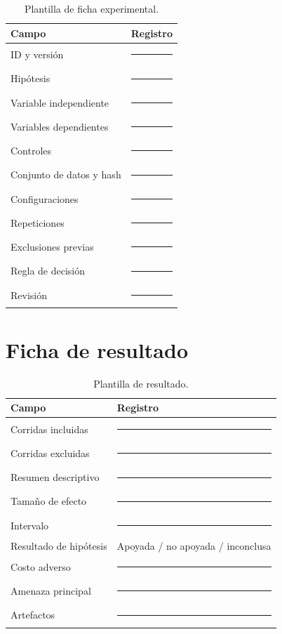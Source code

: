 \begin{table}[H]
\centering
\caption{Plantilla de ficha experimental.}
\label{tab:ficha-experimento}
\begin{tabularx}{\textwidth}{p{3.8cm}X}
\toprule
Campo & Registro \\
\midrule
ID y versión & \rule{8cm}{0.4pt}\\
Hipótesis & \rule{8cm}{0.4pt}\\
Variable independiente & \rule{8cm}{0.4pt}\\
Variables dependientes & \rule{8cm}{0.4pt}\\
Controles & \rule{8cm}{0.4pt}\\
Conjunto de datos y hash & \rule{8cm}{0.4pt}\\
Configuraciones & \rule{8cm}{0.4pt}\\
Repeticiones & \rule{8cm}{0.4pt}\\
Exclusiones previas & \rule{8cm}{0.4pt}\\
Regla de decisión & \rule{8cm}{0.4pt}\\
Revisión & \rule{8cm}{0.4pt}\\
\bottomrule
\end{tabularx}
\end{table}

\section{Ficha de resultado}

\begin{table}[H]
\centering
\caption{Plantilla de resultado.}
\label{tab:ficha-resultado}
\begin{tabularx}{\textwidth}{p{3.8cm}X}
\toprule
Campo & Registro \\
\midrule
Corridas incluidas & \rule{8cm}{0.4pt}\\
Corridas excluidas & \rule{8cm}{0.4pt}\\
Resumen descriptivo & \rule{8cm}{0.4pt}\\
Tamaño de efecto & \rule{8cm}{0.4pt}\\
Intervalo & \rule{8cm}{0.4pt}\\
Resultado de hipótesis & Apoyada / no apoyada / inconclusa\\
Costo adverso & \rule{8cm}{0.4pt}\\
Amenaza principal & \rule{8cm}{0.4pt}\\
Artefactos & \rule{8cm}{0.4pt}\\
\bottomrule
\end{tabularx}
\end{table}

